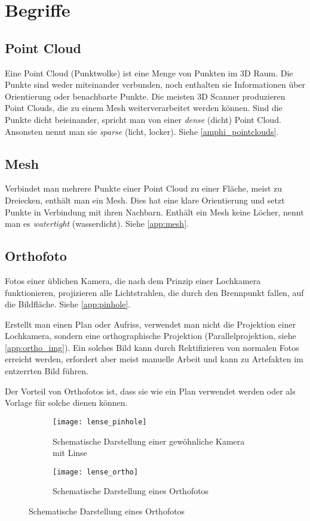 \chapter{Begriffe}
		\section{Point Cloud}\label{app:point_cloud}
			Eine Point Cloud (Punktwolke) ist eine Menge von Punkten im 3D Raum. Die Punkte sind weder miteinander verbunden, noch enthalten sie Informationen über Orientierung oder benachbarte Punkte. Die meisten 3D Scanner produzieren Point Clouds, die zu einem Mesh weiterverarbeitet werden können.
			Sind die Punkte dicht beieinander, spricht man von einer \emph{dense} (dicht) Point Cloud. Ansonsten nennt man sie \emph{sparse} (licht, locker).
			Siehe \autoref{amphi_pointclouds}.
		
		\section{Mesh}\label{app:mesh}
			Verbindet man mehrere Punkte einer Point Cloud zu einer Fläche, meist zu Dreiecken, enthält man ein Mesh. Dies hat eine klare Orientierung und setzt Punkte in Verbindung mit ihren Nachbarn. Enthält ein Mesh keine Löcher, nennt man es \emph{watertight} (wasserdicht).
			Siehe \autoref{app:mesh}.
		
		\section{Orthofoto} \label{app:orthofoto}
			Fotos einer üblichen Kamera, die nach dem Prinzip einer Lochkamera funktionieren, projizieren alle Lichtstrahlen, die durch den Brennpunkt fallen, auf die Bildfläche. Siehe \autoref{app:pinhole}.
			
			Erstellt man einen Plan oder Aufriss, verwendet man nicht die Projektion einer Lochkamera, sondern eine orthographische Projektion (Parallelprojektion, siehe \autoref{app:ortho_img}). Ein solches Bild kann durch Rektifizieren von normalen Fotos erreicht werden, erfordert aber meist manuelle Arbeit und kann zu Artefakten im entzerrten Bild führen.
			
			Der Vorteil von Orthofotos ist, dass sie wie ein Plan verwendet werden oder als Vorlage für solche dienen können.
			
			\begin{figure}
				\begin{subfigure}{0.5\linewidth}
					\texttt{[image: lense\_pinhole]}
					\caption{Schematische Darstellung einer gewöhnliche Kamera mit Linse}
					\label{app:pinhole}
				\end{subfigure}
				\hspace{0.2\linewidth}
				\begin{subfigure}{0.5\linewidth}
					\texttt{[image: lense\_ortho]}
					\caption{Schematische Darstellung eines Orthofotos}
					\label{app:ortho_img}
				\end{subfigure}
			\end{figure}

